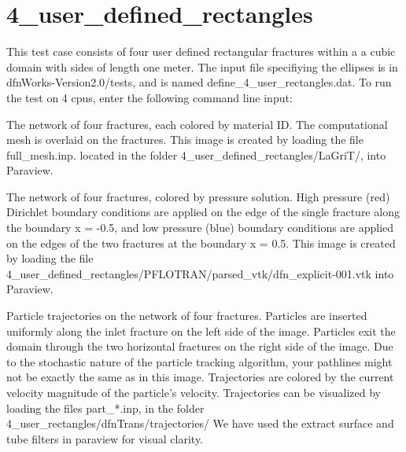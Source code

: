 \documentclass[letterpaper,10pt,english]{sphinxmanual}
\begin{document}
\section{4\_user\_defined\_rectangles}
\label{\detokenize{tutorial:user-defined-rectangles}}
This test case consists of four user defined rectangular fractures within a a cubic domain with sides of length one meter. The input file specifiying the ellipses is in dfnWorks-Version2.0/tests, and is named define\_4\_user\_rectangles.dat. To run the test on 4 cpus, enter the following command line input:

The network of four fractures, each colored by material ID. The computational mesh is overlaid on the fractures. This image is created by loading the file full\_mesh.inp. located in the folder 4\_user\_defined\_rectangles/LaGriT/, into Paraview.


The network of four fractures,  colored by pressure solution.
High pressure (red) Dirichlet boundary conditions are applied on the edge of the single fracture along the boundary x = -0.5, and low pressure (blue) boundary conditions are applied on the edges of the two fractures at the boundary x = 0.5.
This image is created by loading the file 4\_user\_defined\_rectangles/PFLOTRAN/parsed\_vtk/dfn\_explicit-001.vtk into Paraview.


Particle trajectories on the network of four fractures.
Particles are inserted uniformly along the inlet fracture on the left side of the image.
Particles exit the domain through the two horizontal fractures on the right side of the image.
Due to the stochastic nature of the particle tracking algorithm, your pathlines might not be exactly the same as in this image.
Trajectories are colored by the current velocity magnitude of the particle's velocity.
Trajectories can be visualized by loading the files part\_*.inp, in the folder 4\_user\_rectangles/dfnTrans/trajectories/
We have used the extract surface and tube filters in paraview for visual clarity.

\end{document}
